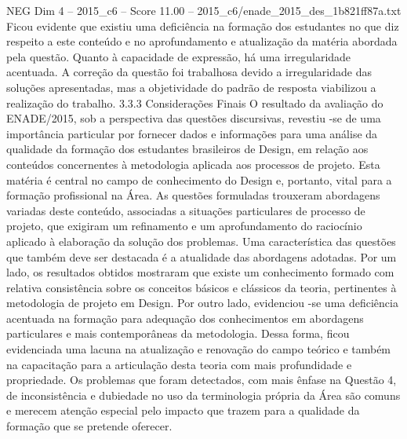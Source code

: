 \begin{textsample}{NEG Dim 4 – 2015\_c6 – Score 11.00 – 2015\_c6/enade\_2015\_des\_1b821ff87a.txt}
Ficou evidente que existiu uma deficiência na formação dos estudantes no que diz respeito a este conteúdo e no aprofundamento e atualização da matéria abordada pela questão.
Quanto à capacidade de expressão, há uma irregularidade acentuada.
A correção da questão foi trabalhosa devido a irregularidade das soluções apresentadas, mas a objetividade do padrão de resposta viabilizou a realização do trabalho. 3.3.3 Considerações Finais O resultado da avaliação do ENADE/2015, sob a perspectiva das questões discursivas, revestiu -se de uma importância particular por fornecer dados e informações para uma análise da qualidade da formação dos estudantes brasileiros de Design, em relação aos conteúdos concernentes à metodologia aplicada aos processos de projeto.
Esta matéria é central no campo de conhecimento do Design e, portanto, vital para a formação profissional na Área.
As questões formuladas trouxeram abordagens variadas deste conteúdo, associadas a situações particulares de processo de projeto, que exigiram um refinamento e um aprofundamento do raciocínio aplicado à elaboração da solução dos problemas.
Uma característica das questões que também deve ser destacada é a atualidade das abordagens adotadas.
Por um lado, os resultados obtidos mostraram que existe um conhecimento formado com relativa consistência sobre os conceitos básicos e clássicos da teoria, pertinentes à metodologia de projeto em Design.
Por outro lado, evidenciou -se uma deficiência acentuada na formação para adequação dos conhecimentos em abordagens particulares e mais contemporâneas da metodologia.
Dessa forma, ficou evidenciada uma lacuna na atualização e renovação do campo teórico e também na capacitação para a articulação desta teoria com mais profundidade e propriedade.
Os problemas que foram detectados, com mais ênfase na Questão 4, de inconsistência e dubiedade no uso da terminologia própria da Área são comuns e merecem atenção especial pelo impacto que trazem para a qualidade da formação que se pretende oferecer.

\end{textsample}
